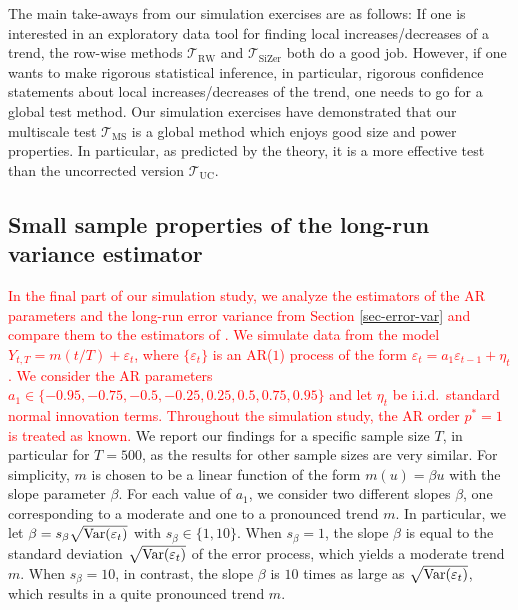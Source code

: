 The main take-aways from our simulation exercises are as follows: If one is interested in an exploratory data tool for finding local increases/decreases of a trend, the row-wise methods $\mathcal{T}_{\text{RW}}$ and $\mathcal{T}_{\text{SiZer}}$ both do a good job. However, if one wants to make rigorous statistical inference, in particular, rigorous confidence statements about local increases/decreases of the trend, one needs to go for a global test method. Our simulation exercises have demonstrated that our multiscale test $\mathcal{T}_{\text{MS}}$ is a global method which enjoys good size and power properties. In particular, as predicted by the theory, it is a more effective test than the uncorrected version $\mathcal{T}_{\text{UC}}$. 


\subsection{Small sample properties of the long-run variance estimator}\label{subsec-sim-lrv}


\textcolor{red}{In the final part of our simulation study, we analyze the estimators of the AR parameters and the long-run error variance from Section \ref{sec-error-var} and compare them to the estimators of \cite{Hall2003}. We simulate data from the model $Y_{t,T} = m(t/T) + \varepsilon_t$, where $\{ \varepsilon_t\}$ is an AR($1$) process of the form $\varepsilon_t = a_1 \varepsilon_{t-1} + \eta_t$. We consider the AR parameters $a_1 \in \{-0.95,-0.75,-0.5,-0.25,0.25,0.5,0.75,0.95\}$ and let $\eta_t$ be i.i.d.\ standard normal innovation terms. Throughout the simulation study, the AR order $p^*=1$ is treated as known.} We report our findings for a specific sample size $T$, in particular for $T=500$, as the results for other sample sizes are very similar. For simplicity, $m$ is chosen to be a linear function of the form $m(u) = \beta u$ with the slope parameter $\beta$. For each value of $a_1$, we consider two different slopes $\beta$, one corresponding to a moderate and one to a pronounced trend $m$. 
In particular, we let $\beta = s_\beta \sqrt{\textnormal{Var}(\varepsilon_t)}$ with $s_\beta \in \{1,10\}$. When $s_\beta = 1$, the slope $\beta$ is equal to the standard deviation $\sqrt{\textnormal{Var}(\varepsilon_t)}$ of the error process, which yields a moderate trend $m$. When $s_\beta = 10$, in contrast, the slope $\beta$ is $10$ times as large as $\sqrt{\textnormal{Var}(\varepsilon_t)}$, which results in a quite pronounced trend $m$. 


